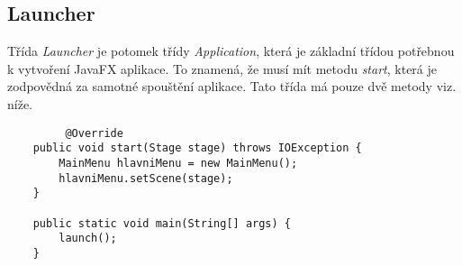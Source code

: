 \subsection{Launcher}
Třída \textit{Launcher} je potomek třídy \textit{Application}, která je základní třídou potřebnou k vytvoření JavaFX aplikace. To znamená, že musí mít metodu \textit{start}, která je zodpovědná za samotné spouštění aplikace. Tato třída má pouze dvě metody viz. níže. 

\begin{verbatim}
         @Override
    public void start(Stage stage) throws IOException {
        MainMenu hlavniMenu = new MainMenu();
        hlavniMenu.setScene(stage);
    }

    public static void main(String[] args) {
        launch();
    }
\end{verbatim}


